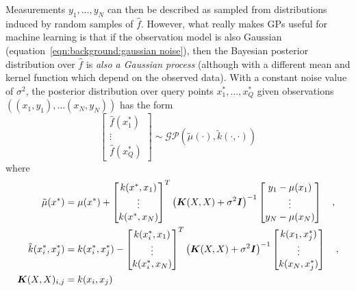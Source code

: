 Measurements $y_1,\ldots,y_N$ can then be described as sampled from distributions
induced by random samples of $\hat f$.
However, what really makes GPs useful for machine learning is that
if the observation model is also Gaussian (equation~\ref{eqn:background:gaussian noise}),
then the Bayesian posterior distribution over $\hat f$ is \emph{also a Gaussian process}
(although with a different mean and kernel function which depend on the observed data).
With a constant noise value of $\sigma^2$, the posterior distribution over query points
$x^*_1, \ldots, x^*_Q$ 
given observations
$((x_1, y_1), \ldots (x_N, y_N))$
has the form
\begin{equation}
    \begin{bmatrix}
        \hat f(x^*_1) \\
        \vdots \\
        \hat f(x^*_Q)
    \end{bmatrix}
    \sim \mathcal{GP} \left(\tilde \mu (\cdot), \tilde k(\cdot, \cdot) \right)
\end{equation}
where
\begin{align}
    \tilde \mu(x^*) &= \mu(x^*) 
    + \begin{bmatrix}
        k(x^*, x_1) \\
        \vdots \\
        k(x^*, x_N)
    \end{bmatrix}^T
    \left({\bm{K}}(X, X) + \sigma^2{\bm{I}}\right)^{-1}
    \begin{bmatrix}
        y_1 - \mu(x_1) \\
        \vdots \\
        y_N - \mu(x_N) \\
    \end{bmatrix}\quad,  \\
    \tilde k(x^*_i, x^*_j) &=
    k(x^*_i, x^*_j) -
    \begin{bmatrix}
        k(x^*_i, x_1) \\
        \vdots \\
        k(x^*_i, x_N)
    \end{bmatrix}^T
    \left({\bm{K}}(X, X) + \sigma^2{\bm{I}}\right)^{-1}
    \begin{bmatrix}
        k(x_1, x^*_j) \\
        \vdots \\
        k(x_N, x^*_j)
    \end{bmatrix}\quad,  \\
    {\bm{K}}(X,X)_{i,j} &= k(x_i,x_j)
\end{align}

